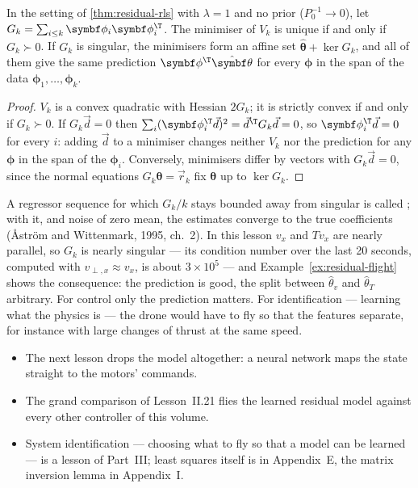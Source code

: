 \begin{theorem}
\label{thm:residual-pe}
In the setting of \cref{thm:residual-rls} with $\lambda = 1$ and no prior ($P_0^{-1} \to 0$), let $G_k = \sum_{i \le k}\symbf\phi_i\symbf\phi_i^\T$. The minimiser of $V_k$ is unique if and only if $G_k \succ 0$. If $G_k$ is singular, the minimisers form an affine set $\hat{\symbf\theta} + \ker G_k$, and all of them give the same prediction $\symbf\phi^\T\hat{\symbf\theta}$ for every $\symbf\phi$ in the span of the data $\symbf\phi_1, \dots, \symbf\phi_k$.
\end{theorem}
\begin{proof}
$V_k$ is a convex quadratic with Hessian $2G_k$; it is strictly convex if and only if $G_k \succ 0$. If $G_k\vec d = 0$ then $\sum_i(\symbf\phi_i^\T\vec d)^2 = \vec d^\T G_k\vec d = 0$, so $\symbf\phi_i^\T\vec d = 0$ for every $i$: adding $\vec d$ to a minimiser changes neither $V_k$ nor the prediction for any $\symbf\phi$ in the span of the $\symbf\phi_i$. Conversely, minimisers differ by vectors with $G_k\vec d = 0$, since the normal equations $G_k\symbf\theta = \vec r_k$ fix $\symbf\theta$ up to $\ker G_k$.
\end{proof}

A regressor sequence for which $G_k/k$ stays bounded away from singular is called ; with it, and noise of zero mean, the estimates converge to the true coefficients (Åström and Wittenmark, 1995, ch.~2). In this lesson $v_x$ and $Tv_x$ are nearly parallel, so $G_k$ is nearly singular — its condition number over the last 20 seconds, computed with $v_{\perp,x} \approx v_x$, is about $3\times10^5$ — and Example~\ref{ex:residual-flight} shows the consequence: the prediction is good, the split between $\hat\theta_v$ and $\hat\theta_T$ arbitrary. For control only the prediction matters. For identification — learning what the physics is — the drone would have to fly so that the features separate, for instance with large changes of thrust at the same speed.

\begin{lookahead}
\begin{itemize}[leftmargin=1.2em]
  \item The next lesson drops the model altogether: a neural network maps the state straight to the motors' commands.
  \item The grand comparison of Lesson~II.21 flies the learned residual model against every other controller of this volume.
  \item System identification — choosing what to fly so that a model can be learned — is a lesson of Part~III; least squares itself is in Appendix~E, the matrix inversion lemma in Appendix~I.
\end{itemize}
\end{lookahead}

